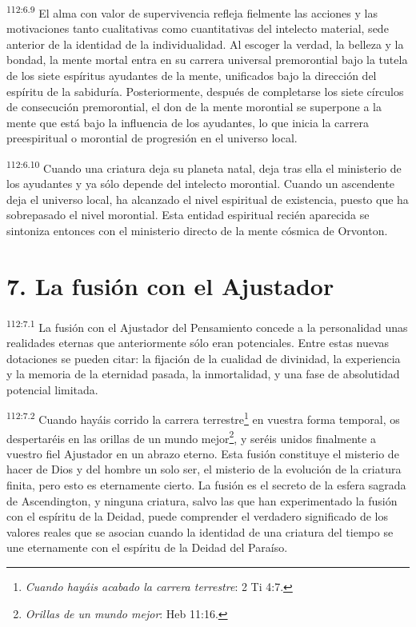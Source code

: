 \documentclass[twoside, 11pt]{book}
\begin{document}
\par
\textsuperscript{112:6.9} El alma con valor de supervivencia refleja fielmente las acciones y las motivaciones tanto cualitativas como cuantitativas del intelecto material, sede anterior de la identidad de la individualidad. Al escoger la verdad, la belleza y la bondad, la mente mortal entra en su carrera universal premorontial bajo la tutela de los siete espíritus ayudantes de la mente, unificados bajo la dirección del espíritu de la sabiduría. Posteriormente, después de completarse los siete círculos de consecución premorontial, el don de la mente morontial se superpone a la mente que está bajo la influencia de los ayudantes, lo que inicia la carrera preespiritual o morontial de progresión en el universo local.

\par
\textsuperscript{112:6.10} Cuando una criatura deja su planeta natal, deja tras ella el ministerio de los ayudantes y ya sólo depende del intelecto morontial. Cuando un ascendente deja el universo local, ha alcanzado el nivel espiritual de existencia, puesto que ha sobrepasado el nivel morontial. Esta entidad espiritual recién aparecida se sintoniza entonces con el ministerio directo de la mente cósmica de Orvonton.

\section*{7. La fusión con el Ajustador}
\par
\textsuperscript{112:7.1} La fusión con el Ajustador del Pensamiento concede a la personalidad unas realidades eternas que anteriormente sólo eran potenciales. Entre estas nuevas dotaciones se pueden citar: la fijación de la cualidad de divinidad, la experiencia y la memoria de la eternidad pasada, la inmortalidad, y una fase de absolutidad potencial limitada.

\par
\textsuperscript{112:7.2} Cuando hayáis corrido la carrera terrestre\footnote{\textit{Cuando hayáis acabado la carrera terrestre}: 2 Ti 4:7.} en vuestra forma temporal, os despertaréis en las orillas de un mundo mejor\footnote{\textit{Orillas de un mundo mejor}: Heb 11:16.}, y seréis unidos finalmente a vuestro fiel Ajustador en un abrazo eterno. Esta fusión constituye el misterio de hacer de Dios y del hombre un solo ser, el misterio de la evolución de la criatura finita, pero esto es eternamente cierto. La fusión es el secreto de la esfera sagrada de Ascendington, y ninguna criatura, salvo las que han experimentado la fusión con el espíritu de la Deidad, puede comprender el verdadero significado de los valores reales que se asocian cuando la identidad de una criatura del tiempo se une eternamente con el espíritu de la Deidad del Paraíso.
\end{document}
